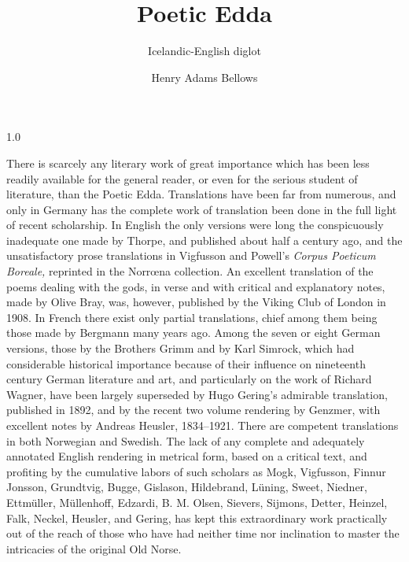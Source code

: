\documentclass{scrbook}
\newcommand{\tocnumwidth}{5em}
\newcommand{\tocspacing}{1.0} %
\newcommand{\tocmarginwidth}{2.55em} %
\newcommand{\tocnumwidth}{5em}
\newcommand{\tocspacing}{0.9} %
\newcommand{\tocmarginwidth}{2.55em} %
\newcommand{\tocnumwidth}{5em}
\newcommand{\tocspacing}{0.9}
\newcommand{\tocmarginwidth}{2.55em} %
\newcommand{\ndash}{--}
\begin{document}
\title{Poetic Edda}
\subtitle{Icelandic-English diglot}
\author{Henry Adams Bellows}

\date{}
\publishers{\small{Typeset by Bogdan Opanchuk, compiled \today}}

\maketitle

\frontmatter

\clearpage
\begingroup

	\pagestyle{empty}
	\renewcommand*{\chapterpagestyle}{empty}

	\renewcommand{\@pnumwidth}{\tocnumwidth}
	\renewcommand{\@tocrmarg}{\tocmarginwidth plus1fil} %

	\begin{spacing}{\tocspacing}
	\tableofcontents
	\end{spacing}

\clearpage
\endgroup

\mainmatter


There is scarcely any literary work of great importance which has been less readily available for the general reader, or even for the serious student of literature, than the Poetic Edda. Translations have been far from numerous, and only in Germany has the complete work of translation been done in the full light of recent scholarship. In English the only versions were long the conspicuously inadequate one made by Thorpe, and published about half a century ago, and the unsatisfactory prose translations in Vigfusson and Powell's \emph{Corpus Poeticum Boreale,} reprinted in the Norrœna collection. An excellent translation of the poems dealing with the gods, in verse and with critical and explanatory notes, made by Olive Bray, was, however, published by the Viking Club of London in 1908. In French there exist only partial translations, chief among them being those made by Bergmann many years ago. Among the seven or eight German versions, those by the Brothers Grimm and by Karl Simrock, which had considerable historical importance because of their influence on nineteenth century German literature and art, and particularly on the work of Richard Wagner, have been largely superseded by Hugo Gering's admirable translation, published in 1892, and by the recent two volume rendering by Genzmer, with excellent notes by Andreas Heusler, 1834\ndash1921. There are competent translations in both Norwegian and Swedish. The lack of any complete and adequately annotated English rendering in metrical form, based on a critical text, and profiting by the cumulative labors of such scholars as Mogk, Vigfusson, Finnur Jonsson, Grundtvig, Bugge, Gislason, Hildebrand, Lüning, Sweet, Niedner, Ettmüller, Müllenhoff, Edzardi, B. M. Olsen, Sievers, Sijmons, Detter, Heinzel, Falk, Neckel, Heusler, and Gering, has kept this extraordinary work practically out of the reach of those who have had neither time nor inclination to master the intricacies of the original Old Norse.
\end{document}

